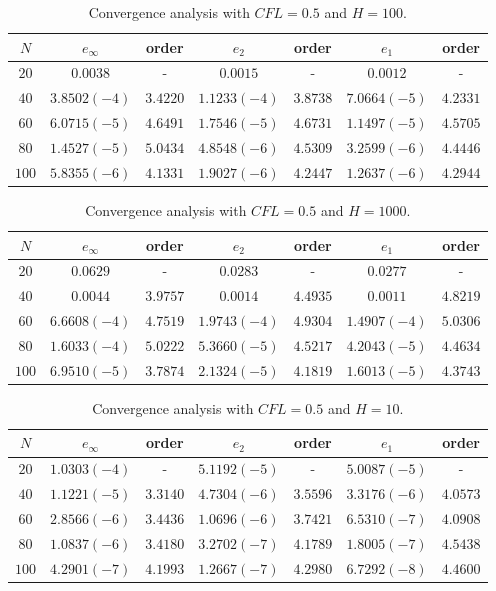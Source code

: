 \documentclass[10pt,a4paper]{amsart}
\begin{document}
\begin{table}
\begin{tabular}{c|c|c|c|c|c|c}
$N$ & $e_{\infty}$ & order & $e_2$ & order & $e_1$ & order \\ 
\hline 
\hline
$20$ & $0.0038$ & - & $0.0015$ & - & $0.0012$ & - \\ 
\hline 
$40$ & $3.8502 (-4)$ & $3.4220$ & $1.1233 (-4)$ & $3.8738$ & $7.0664 (-5)$ & $4.2331$ \\ 
\hline 
$60$ & $6.0715 (-5)$ & $4.6491$ & $1.7546 (-5)$ & $4.6731$ & $1.1497 (-5)$ & $4.5705$ \\
\hline 
$80$ & $1.4527 (-5)$ & $5.0434$ & $4.8548 (-6)$ & $4.5309$ & $3.2599 (-6)$ & $4.4446$ \\ 
\hline 
$100$ & $5.8355(-6)$ & $4.1331$ & $1.9027 (-6)$ & $4.2447$ & $1.2637 (-6)$ & $4.2944$  \\ 
\end{tabular} 
\caption{Convergence analysis with $CFL=0.5$ and $H=100$.}
\label{CV_order4_hp100}
\end{table}

\begin{table}
\begin{tabular}{c|c|c|c|c|c|c}
$N$ & $e_{\infty}$ & order & $e_2$ & order & $e_1$ & order \\ 
\hline 
\hline
$20$ & $0.0629$ & - & $0.0283$ & - & $0.0277$ & - \\ 
\hline 
$40$ & $0.0044$ & $3.9757$ & $0.0014$ & $4.4935$ & $0.0011$ & $4.8219$ \\ 
\hline 
$60$ & $6.6608 (-4)$ & $4.7519$ & $1.9743 (-4)$ & $4.9304$ & $1.4907 (-4)$ & $5.0306$ \\
\hline 
$80$ & $1.6033 (-4)$ & $5.0222$ & $5.3660 (-5)$ & $4.5217$ & $4.2043 (-5)$ & $4.4634$ \\ 
\hline 
$100$ & $6.9510(-5)$ & $3.7874$ & $2.1324 (-5)$ & $4.1819$ & $1.6013 (-5)$ & $4.3743$  \\ 
\end{tabular} 
\caption{Convergence analysis with $CFL=0.5$ and $H=1000$.}
\label{CV_order4_hp1000}
\end{table}

\begin{table}
\begin{tabular}{c|c|c|c|c|c|c}
$N$ & $e_{\infty}$ & order & $e_2$ & order & $e_1$ & order \\ 
\hline 
\hline
$20$ & $1.0303 (-4)$ & - & $5.1192 (-5)$ & - & $5.0087 (-5)$ & - \\ 
\hline 
$40$ & $1.1221 (-5)$ & $3.3140$ & $4.7304 (-6)$ & $3.5596$ & $3.3176 (-6)$ & $4.0573$ \\ 
\hline 
$60$ & $2.8566 (-6)$ & $3.4436$ & $1.0696 (-6)$ & $3.7421$ & $6.5310 (-7)$ & $4.0908$ \\
\hline 
$80$ & $1.0837 (-6)$ & $3.4180$ & $3.2702 (-7)$ & $4.1789$ & $1.8005 (-7)$ & $4.5438$ \\ 
\hline 
$100$ & $4.2901(-7)$ & $4.1993$ & $1.2667 (-7)$ & $4.2980$ & $6.7292 (-8)$ & $4.4600$  \\ 
\end{tabular} 
\caption{Convergence analysis with $CFL=0.5$ and $H=10$.}
\label{CV_order8_hp10}
\end{table}
\end{document}
